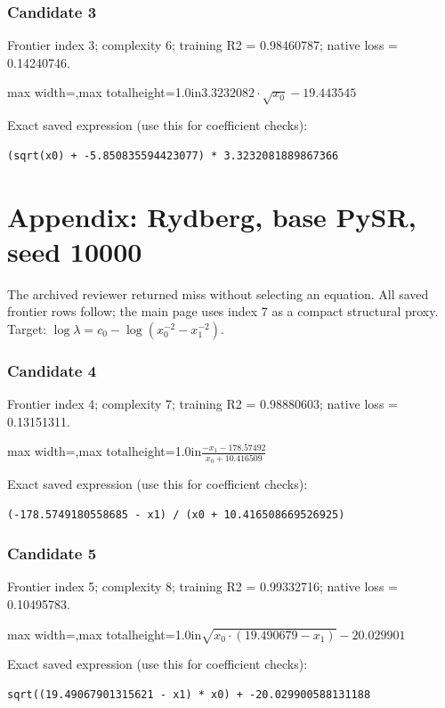 \documentclass[10pt,letterpaper,landscape]{article}
\begin{document}
\subsubsection*{Candidate 3}
Frontier index 3; complexity 6; training R2 = 0.98460787; native loss = 0.14240746.
\begin{center}\begin{adjustbox}{max width=\linewidth,max totalheight=1.0in}$\displaystyle 3.3232082 \cdot \sqrt{x_{0}} - 19.443545$\end{adjustbox}\end{center}
{\scriptsize Exact saved expression (use this for coefficient checks):}
\begin{lstlisting}
(sqrt(x0) + -5.850835594423077) * 3.3232081889867366
\end{lstlisting}
\clearpage\section*{Appendix: Rydberg, base PySR, seed 10000}
The archived reviewer returned miss without selecting an equation. All saved frontier rows follow; the main page uses index 7 as a compact structural proxy. Target: $\log\lambda=c_0-\log(x_0^{-2}-x_1^{-2})$.
\subsubsection*{Candidate 4}
Frontier index 4; complexity 7; training R2 = 0.98880603; native loss = 0.13151311.
\begin{center}\begin{adjustbox}{max width=\linewidth,max totalheight=1.0in}$\displaystyle \frac{- x_{1} - 178.57492}{x_{0} + 10.416509}$\end{adjustbox}\end{center}
{\scriptsize Exact saved expression (use this for coefficient checks):}
\begin{lstlisting}
(-178.5749180558685 - x1) / (x0 + 10.416508669526925)
\end{lstlisting}
\subsubsection*{Candidate 5}
Frontier index 5; complexity 8; training R2 = 0.99332716; native loss = 0.10495783.
\begin{center}\begin{adjustbox}{max width=\linewidth,max totalheight=1.0in}$\displaystyle \sqrt{x_{0} \cdot \left(19.490679 - x_{1}\right)} - 20.029901$\end{adjustbox}\end{center}
{\scriptsize Exact saved expression (use this for coefficient checks):}
\begin{lstlisting}
sqrt((19.49067901315621 - x1) * x0) + -20.029900588131188
\end{lstlisting}
\end{document}
